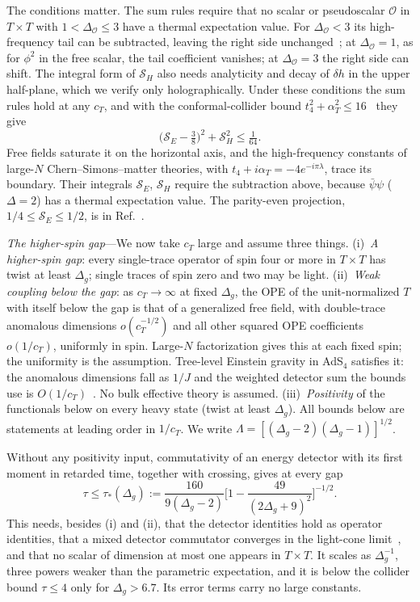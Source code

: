 \documentclass[aps,prl,twocolumn,superscriptaddress,nofootinbib,floatfix]{revtex4-2}
\begin{document}
The conditions matter. The sum rules require that no scalar or pseudoscalar $\mathcal O$ in $T\times T$ with
$1<\Delta_{\mathcal O}\le3$ have a thermal expectation value. For $\Delta_{\mathcal O}<3$ its high-frequency tail can be subtracted,
leaving the right side unchanged~\cite{Chowdhury:2016hjy,Lucas:2017dqa}; at $\Delta_{\mathcal O}=1$, as for $\phi^2$ in the free
scalar, the tail coefficient vanishes; at $\Delta_{\mathcal O}=3$ the right side can shift. The integral form of $\mathcal S_H$
also needs analyticity and decay of $\delta h$ in the upper half-plane, which we verify only holographically. Under these
conditions the sum rules hold at any $c_T$, and with the conformal-collider bound $t_4^2+\alpha_T^2\le16$~\cite{CDPrakash} they give
\begin{equation}
\big(\mathcal S_E-\tfrac38\big)^2+\mathcal S_H^2\le\tfrac1{64}.
\label{eq:disc}
\end{equation}
Free fields saturate it on the horizontal axis, and the high-frequency constants of large-$N$ Chern--Simons--matter theories,
with $t_4+i\alpha_T=-4e^{-i\pi\lambda}$, trace its boundary. Their integrals $\mathcal S_E$, $\mathcal S_H$ require the subtraction
above, because $\bar\psi\psi$ ($\Delta=2$) has a thermal expectation value. The parity-even projection, $1/4\le\mathcal S_E\le1/2$,
is in Ref.~\cite{Chowdhury:2016hjy}.

\textit{The higher-spin gap}---We now take $c_T$ large and assume three things. (i)~\emph{A higher-spin gap}: every single-trace
operator of spin four or more in $T\times T$ has twist at least $\Delta_g$; single traces of spin zero and two may be light.
(ii)~\emph{Weak coupling below the gap}: as $c_T\to\infty$ at fixed $\Delta_g$, the OPE of the unit-normalized $T$ with itself below
the gap is that of a generalized free field, with double-trace anomalous dimensions $o(c_T^{-1/2})$ and all other squared OPE
coefficients $o(1/c_T)$, uniformly in spin. Large-$N$ factorization gives this at each fixed spin; the uniformity is the
assumption. Tree-level Einstein gravity in AdS$_4$ satisfies it: the anomalous dimensions fall as $1/J$ and the weighted detector sum the bounds use is $O(1/c_T)$~\cite{SM}. No bulk effective theory is assumed.
(iii)~\emph{Positivity} of the functionals below on every heavy state (twist at least $\Delta_g$). All bounds below are
statements at leading order in $1/c_T$. We write $\Lambda=[(\Delta_g-2)(\Delta_g-1)]^{1/2}$.

Without any positivity input, commutativity of an energy detector with its first moment in retarded time, together with crossing,
gives at every gap
\begin{equation}
\tau\le\tau_*(\Delta_g):=\frac{160}{9(\Delta_g-2)}\Big[1-\frac{49}{(2\Delta_g+9)^2}\Big]^{-1/2}.
\label{eq:angular}
\end{equation}
This needs, besides (i) and (ii), that the detector identities hold as operator identities, that a mixed detector commutator
converges in the light-cone limit~\cite{KKSDZ}, and that no scalar of dimension at most one appears in $T\times T$. It scales as
$\Delta_g^{-1}$, three powers weaker than the parametric expectation, and it is below the collider bound $\tau\le4$ only for
$\Delta_g>6.7$. Its error terms carry no large constants.
\end{document}
